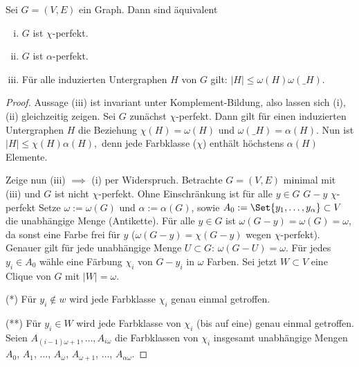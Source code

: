 \begin{st}[Lovász, 1972]
    Sei $G = (V, E)$ ein Graph.
    Dann sind äquivalent
    \begin{enumerate}[(i)]
        \item
            $G$ ist $\chi$-perfekt.
        \item
            $G$ ist $\alpha$-perfekt.
        \item
            Für alle induzierten Untergraphen $H$ von $G$ gilt:
            \begin{math}
                |H| \le \omega(H) \omega(\_H).
            \end{math}
    \end{enumerate}
    \begin{proof}
        Aussage (iii) ist invariant unter Komplement-Bildung, also lassen sich (i),(ii) gleichzeitig zeigen.
        Sei $G$ zunächst $\chi$-perfekt.
        Dann gilt für einen induzierten Untergraphen $H$ die Beziehung $\chi(H) = \omega(H)$ und $\omega(\_H) = \alpha(H)$.
        Nun ist
        \begin{math}
            |H| \le \chi(H) \alpha(H),
        \end{math}
        denn jede Farbklasse ($\chi$) enthält höchstens $\alpha(H)$ Elemente.

        Zeige nun (iii) $\implies$ (i) per Widerspruch.
        Betrachte $G = (V, E)$ minimal mit (iii) und $G$ ist nicht $\chi$-perfekt.
        Ohne Einschränkung ist für alle $y \in G$ $G - y$ $\chi$-perfekt
        Setze $\omega := \omega(G)$ und $\alpha := \alpha(G)$, sowie $A_0 := \Set{y_1, \dotsc, y_\alpha} \subset V$ die unabhängige Menge (Antikette).
        Für alle $y \in G$ ist $\omega(G - y) = \omega(G) = \omega$, da sonst eine Farbe frei für $y$ ($\omega(G-y) = \chi(G-y)$ wegen $\chi$-perfekt).
        Genauer gilt für jede unabhängige Menge $U \subset G$: $\omega(G - U) = \omega$.
        Für jedes $y_i \in A_0$ wähle eine Färbung $\chi_i$ von $G - y_i$ in $\omega$ Farben.
        Sei jetzt $W \subset V$ eine Clique von $G$ mit $|W| = \omega$.

        (*) Für $y_i \not\in w$ wird jede Farbklasse $\chi_i$ genau einmal getroffen.

        (**) Für $y_i \in W$ wird jede Farbklasse von $\chi_i$ (bis auf eine) genau einmal getroffen.
        Seien $A_{(i-1)\omega + 1}, \dotsc, A_{i\omega}$ die Farbklassen von $\chi_i$ insgesamt unabhängige Mengen $A_0$, $A_1$, $\dotsc$, $A_\omega$, $A_{\omega + 1}$, $\dotsc$, $A_{\alpha \omega}$.


\end{proof}
\end{st}
